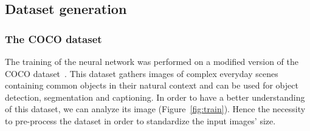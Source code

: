 \documentclass{article}
\begin{document}
    \subsection{Dataset generation}

        \subsubsection{The COCO dataset}
            \label{par:coco}
            The training of the neural network was performed on a modified version of the COCO dataset~\cite{microsoft2014}. This dataset gathers images of complex everyday scenes containing common objects in their natural context and can be used for object detection, segmentation and captioning. In order to have a better understanding of this dataset, we can analyze its image (Figure~\ref{fig:train}). Hence the necessity to pre-process the dataset in order to standardize the input images' size.
\end{document}
